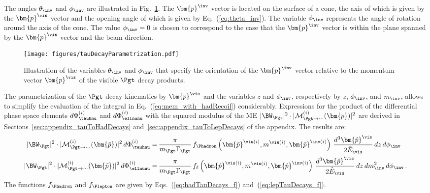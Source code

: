 The angles $\theta_{\inv}$ and $\phi_{\inv}$ are illustrated in Fig.~\ref{fig:tauDecayParametrization}.
The $\bm{p}^{\inv}$ vector is located on the surface of a cone,
the axis of which is given by the $\bm{p}^{\vis}$ vector and the
opening angle of which is given by Eq.~(\ref{eq:theta_inv}).
The variable $\phi_{\inv}$ represents the angle of rotation around the
axis of the cone.
The value $\phi_{\inv} = 0$ is chosen to correspond to the case that
the $\bm{p}^{\inv}$ vector is within the plane spanned by the
$\bm{p}^{\vis}$ vector and the beam direction.

\begin{figure}[h]
\begin{center}
\texttt{[image: figures/tauDecayParametrization.pdf]}
\end{center}
\caption{
  Illustration of the variables $\theta_{\inv}$ and $\phi_{\inv}$ that specify the orientation of the $\bm{p}^{\inv}$ vector
  relative to the momentum vector $\bm{p}^{\vis}$ of the visible $\Pgt$ decay products.
}
\label{fig:tauDecayParametrization}
\end{figure} 

The parametrization of the $\Pgt$ decay kinematics by $\bm{p}^{\vis}$
and the variables $z$ and $\phi_{\inv}$, respectively by $z$, $\phi_{\inv}$, and $m_{\inv}$,
allows to simplify the evaluation of the integral in Eq.~(\ref{eq:mem_with_hadRecoil}) considerably.
Expressions for the product of the differential phase space elements
$d\Phi^{(i)}_{\tauhnu}$  and $d\Phi^{(i)}_{\ellnunu}$ with the squared
modulus of the ME $\vert \BW_{\Pgt} \vert^{2} \cdot \vert \mathcal{M}^{(i)}_{\Pgt\to\cdots}(\bm{p}) \vert^{2}$ are derived in Sections~\ref{sec:appendix_tauToHadDecays} and~\ref{sec:appendix_tauToLepDecays} of the appendix.
The results are:
\begin{align}
\vert \BW_{\Pgt} \vert^{2} \cdot \vert \mathcal{M}^{(i)}_{\Pgt\to\cdots}(\bm{\tilde{p}}) \vert^{2} \, d\Phi^{(i)}_{\tauhnu} 
 = & \, \frac{\pi}{m_{\Pgt}\Gamma_{\Pgt}} \,
 f_{\Phadron}\left(\bm{\hat{p}}^{\vis(i)}, m^{\vis(i)},
   \bm{\hat{p}}^{\inv(i)}\right) \, \frac{d^{3}\bm{\hat{p}}^{\vis}}{2 \hat{E}_{\vis}} \, dz \, d\phi_{\inv} \nonumber \\
\vert \BW_{\Pgt} \vert^{2} \cdot \vert \mathcal{M}^{(i)}_{\Pgt\to\cdots}(\bm{\tilde{p}}) \vert^{2} \, d\Phi^{(i)}_{\ellnunu} 
 = & \, \frac{\pi}{m_{\Pgt}\Gamma_{\Pgt}} \, f_{\ell}\left(\bm{\hat{p}}^{\vis(i)},
 m^{\vis(i)}, \bm{\hat{p}}^{\inv(i)}\right) \, \frac{d^{3}\bm{\hat{p}}^{\vis}}{2 \hat{E}_{\vis}} \, dz \, dm^{2}_{\inv} \, d\phi_{\inv}
 \, .
\label{eq:PSint}
\end{align}
The functions $f_{\Phadron}$ and $f_{\Plepton}$ are given by
Eqs.~(\ref{eq:hadTauDecays_f})
and~(\ref{eq:lepTauDecays_f}).

